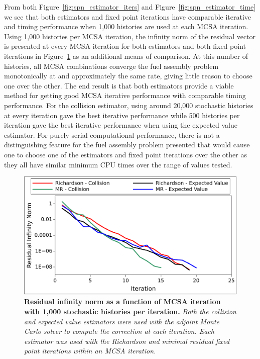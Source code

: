 From both Figure~\ref{fig:spn_estimator_iters} and
Figure~\ref{fig:spn_estimator_time} we see that both estimators and
fixed point iterations have comparable iterative and timing
performance when 1,000 histories are used at each MCSA
iteration. Using 1,000 histories per MCSA iteration, the infinity norm
of the residual vector is presented at every MCSA iteration for both
estimators and both fixed point iterations in
Figure~\ref{fig:spn_estimator_convergence} as an additional means of
comparison. At this number of histories, all MCSA combinations
converge the fuel assembly problem monotonically at and approximately
the same rate, giving little reason to choose one over the other. The
end result is that both estimators provide a viable method for getting
good MCSA iterative performance with comparable timing
performance. For the collision estimator, using around 20,000
stochastic histories at every iteration gave the best iterative
performance while 500 histories per iteration gave the best iterative
performance when using the expected value estimator. For purely serial
computational performance, there is not a distinguishing feature for
the fuel assembly problem presented that would cause one to choose one
of the estimators and fixed point iterations over the other as they
all have similar minimum CPU times over the range of values tested.

\begin{figure}[t!]
  \begin{center}
    \includegraphics[width=6in]{chapters/spn_equations/estimator_convergence.pdf}
  \end{center}
  \caption{\textbf{Residual infinity norm as a function of MCSA
      iteration with 1,000 stochastic histories per iteration.}
    \textit{Both the collision and expected value estimators were used
      with the adjoint Monte Carlo solver to compute the correction at
      each iteration. Each estimator was used with the Richardson and
      minimal residual fixed point iterations within an MCSA
      iteration.}}
  \label{fig:spn_estimator_convergence}
\end{figure}

